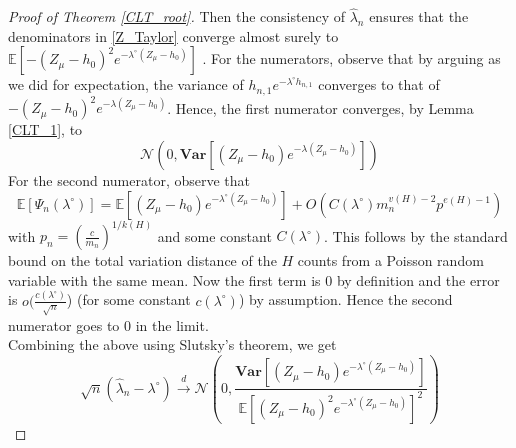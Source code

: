 \documentclass[12pt]{article}
\numberwithin{equation}{section}
\begin{document}
\begin{proof}[Proof of Theorem \ref{CLT_root}]
Then the consistency of \(\hat{\lambda}_n\) ensures that
the denominators in \eqref{Z_Taylor} converge almost surely to \\ \(\mathbb{E}\left[-(Z_{\mu}-h_0)^2e^{-\lambda^{\circ}(Z_{\mu}-h_0)}\right]\) . For the numerators, observe that by arguing as we did for expectation, the variance of \(h_{n,1}e^{-\lambda^{\circ}h_{n,1}}\) converges to that of \(-(Z_{\mu}-h_0)^2e^{-\lambda(Z_{\mu}-h_0)}\). Hence, the first numerator converges, by Lemma \ref{CLT_1}, to 
\[\mathcal{N}\left(0,\mathbf{Var}\left[(Z_{\mu}-h_0)e^{-\lambda(Z_{\mu}-h_0)}\right]\right)\]
For the second numerator, observe that 
\[\mathbb{E}[\Psi_n(\lambda^{\circ})] = \mathbb{E}[(Z_{\mu}-h_0)e^{-\lambda^{\circ}(Z_{\mu}-h_0)}] + O(C(\lambda^{\circ})m_n^{v(H)-2}p^{e(H)-1})\] with \(p_n = (\frac{c}{m_n})^{1/k(H)}\) and some constant $C(\lambda^{\circ})$. This follows by the standard bound on the total variation distance of the \(H\) counts from a Poisson random variable with the same mean. Now the first term is \(0\) by definition and the error is \(o(\frac{c(\lambda^{\circ})}{\sqrt{n}}\)) (for some constant $c(\lambda^{\circ})$) by assumption. Hence the second numerator goes to \(0\) in the limit. \\
Combining the above using Slutsky's theorem, we get
\[
\sqrt{n}(\hat{\lambda}_n - \lambda^{\circ}) \xrightarrow{d} \mathcal{N}\left(0, \frac{\mathbf{Var}\left[(Z_{\mu}-h_0)e^{-\lambda^{\circ}(Z_{\mu}-h_0)}\right]}{\mathbb{E}\left[(Z_{\mu}-h_0)^2e^{-\lambda^{\circ}(Z_{\mu}-h_0)}\right]^2}\right)
\]




\end{proof}
\end{document}
